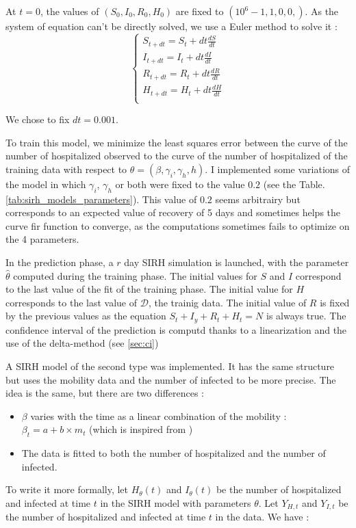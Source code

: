 At $t=0$, the values of $(S_0, I_0, R_0, H_0)$ are fixed to $(10^6 -1, 1, 0, 0,) $. 
As the system of equation can't be directly solved, we use a Euler method to solve it : \\


\begin{equation}
    \left\{
    \begin{aligned}
        S_{t+dt}=S_t + dt \frac{dS}{dt}\\
        I_{t+dt}=I_t + dt \frac{dI}{dt}\\
        R_{t+dt}=R_t + dt \frac{dR}{dt}\\
        H_{t+dt}=H_t + dt \frac{dH}{dt}\\
    \end{aligned}
    \right.
\end{equation}


We chose to fix $dt=0.001$. 


To train this model, we minimize the least squares error between the curve of the number of hospitalized observed to the curve of the number of hospitalized of the training data with respect to $\theta = (\beta, \gamma_i, \gamma_h, h)$. 
I implemented some variations of the model in which $\gamma_i$, $\gamma_h$ or both were fixed to the value $0.2$ (see the Table.\ref{tab:sirh_models_parameters}).
This value of $0.2$ seems arbitrairy but corresponds to an expected value of recovery of 5 days and sometimes helps the curve fir function to converge, as the computations sometimes fails to optimize on the 4 parameters. 


In the prediction phase, a $r$ day SIRH simulation is launched, with the parameter $\hat{\theta}$ computed during the training phase. 
The initial values for $S$ and $I$ correspond to the last value of the fit of the training phase. 
The initial value for $H$ corresponds to the last value of $\mathcal{D}$, the trainig data. 
The initial value of $R$ is fixed by the previous values as the equation $S_t + I_y + R_t + H_t = N$ is always true. 
The confidence interval of the prediction is computd thanks to a linearization and the use of the delta-method (see \ref{sec:ci})

A SIRH model of the second type was implemented. 
It has the same structure but uses the mobility data and the number of infected to be more precise. 
The idea is the same, but there are two differences : 
\begin{itemize}
    \item $\beta$ varies with the time as a linear combination of the mobility : $\beta_t = a + b \times m_t$ (which is inspired from \cite{gerlee2021predicting})
    \item The data is fitted to both the number of hospitalized and the number of infected. 
\end{itemize}
To write it more formally, let $H_\theta(t)$ and $I_\theta(t)$ be the number of hospitalized and infected at time $t$ in the SIRH model with parameters $\theta$.
Let $Y_{H, t}$ and $Y_{I, t}$ be the number of hospitalized and infected at time $t$ in the data.
We have :\\

